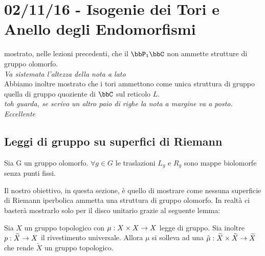 
\chapter{02/11/16 - Isogenie dei Tori e Anello degli Endomorfismi}
\justify

  mostrato, nelle lezioni precedenti, che il $ \bbP_{1}\bbC $ non ammette strutture di gruppo olomorfo. \\
{\it Va sistemata l'altezza della nota a lato}\\
Abbiamo inoltre mostrato che i tori ammettono come unica struttura di gruppo quella di gruppo quoziente di $\bbC$ sul reticolo $L$.\\
{\it toh guarda, se scrivo un altro paio di righe la nota a margine va a posto. Eccellente}




\section{Leggi di gruppo su superfici di Riemann}
\begin{osservazione}
Sia G un gruppo olomorfo. $\forall g \in G$ le traslazioni $L_{g}$ e $R_{g}$ sono mappe biolomorfe senza punti fissi. 
\end{osservazione}

Il nostro obiettivo, in questa sezione, è quello di mostrare come nessuna superficie di Riemann iperbolica ammetta una struttura di gruppo olomorfo. In realtà ci basterà mostrarlo solo per il disco unitario grazie al seguente lemma:
\begin{lemma}
Sia $X$ un gruppo topologico con $\mu : X\times X \rightarrow X$ legge di gruppo. Sia inoltre $p :\widetilde{X} \rightarrow X$ il rivestimento universale.
Allora $\mu$ si solleva ad una $\tilde{\mu} : \widetilde{X} \times \widetilde{X} \rightarrow \widetilde{X}$ che rende $\widetilde{X}$ un gruppo topologico.
\end{lemma}

